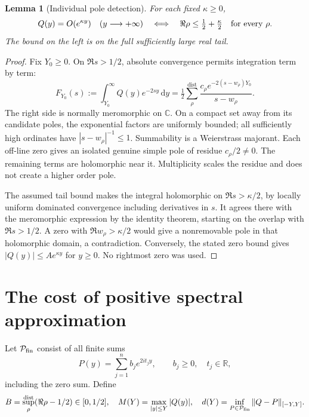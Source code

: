 \documentclass[11pt]{article}
\newtheorem{lemma}[theorem]{Lemma}
\theoremstyle{remark}\newtheorem{remark}[theorem]{Remark}
\newcommand{\R}{\mathbb R}
\newcommand{\C}{\mathbb C}
\newcommand{\dd}{\,\mathrm d}
\newcommand{\dist}{\mathrm{dist}}
\begin{document}
\begin{lemma}[Individual pole detection]\label{lem:strip}
For each fixed $\kappa\ge0$,
\[
 Q(y)=O(e^{\kappa y})\quad(y\longrightarrow+\infty)
 \quad\Longleftrightarrow\quad
 \Re\rho\le\tfrac12+\tfrac\kappa2\quad\hbox{for every }\rho.
\]
The bound on the left is on the full sufficiently large real tail.
\end{lemma}
\begin{proof}
Fix $Y_0\ge0$. On $\Re s>1/2$, absolute convergence permits integration
term by term:
\[
 F_{Y_0}(s):=\int_{Y_0}^\infty Q(y)e^{-2sy}\dd y
 =\tfrac12\sum_\rho^\dist
   \frac{c_\rho e^{-2(s-w_\rho)Y_0}}{s-w_\rho}.
\]
The right side is normally meromorphic on $\C$. On a compact set away
from its candidate poles, the exponential factors are uniformly bounded;
all sufficiently high ordinates have $|s-w_\rho|^{-1}\le1$. Summability
is a Weierstrass majorant. Each off-line zero gives an isolated genuine
simple pole of residue $c_\rho/2\ne0$. The remaining terms are holomorphic
near it. Multiplicity scales the residue and does not create a higher
order pole.

The assumed tail bound makes the integral holomorphic on $\Re s>\kappa/2$,
by locally uniform dominated convergence including derivatives in $s$.
It agrees there with the meromorphic expression by the identity theorem,
starting on the overlap with $\Re s>1/2$. A zero with
$\Re w_\rho>\kappa/2$ would give a nonremovable pole in that holomorphic
domain, a contradiction. Conversely, the stated zero bound gives
$|Q(y)|\le A e^{\kappa y}$ for $y\ge0$. No rightmost zero was used.
\end{proof}

\section{The cost of positive spectral approximation}
Let $\mathcal P_{\rm fin}$ consist of all finite sums
\[
 P(y)=\sum_{j=1}^n b_j e^{2it_jy},\qquad b_j\ge0,\quad t_j\in\R,
\]
including the zero sum. Define
\[
 B=\sup_\rho^\dist(\Re\rho-1/2)\in[0,1/2],\quad
 M(Y)=\max_{|y|\le Y}|Q(y)|,\quad
 d(Y)=\inf_{P\in\mathcal P_{\rm fin}}\|Q-P\|_{[-Y,Y]}.
\]
\end{document}
